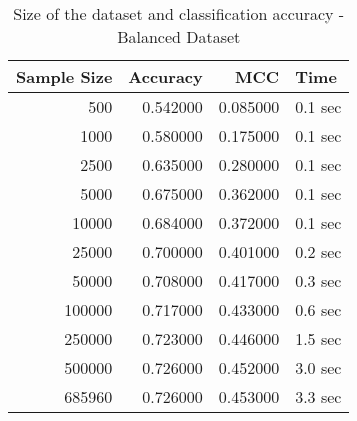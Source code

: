 \begin{table}
\caption{Size of the dataset and classification accuracy - Balanced Dataset}
\label{tab:bal_size}
\begin{tabular}{rrrl}
\toprule
Sample Size & Accuracy & MCC & Time \\
\midrule
500 & 0.542000 & 0.085000 & 0.1 sec \\
1000 & 0.580000 & 0.175000 & 0.1 sec \\
2500 & 0.635000 & 0.280000 & 0.1 sec \\
5000 & 0.675000 & 0.362000 & 0.1 sec \\
10000 & 0.684000 & 0.372000 & 0.1 sec \\
25000 & 0.700000 & 0.401000 & 0.2 sec \\
50000 & 0.708000 & 0.417000 & 0.3 sec \\
100000 & 0.717000 & 0.433000 & 0.6 sec \\
250000 & 0.723000 & 0.446000 & 1.5 sec \\
500000 & 0.726000 & 0.452000 & 3.0 sec \\
685960 & 0.726000 & 0.453000 & 3.3 sec \\
\bottomrule
\end{tabular}
\end{table}
